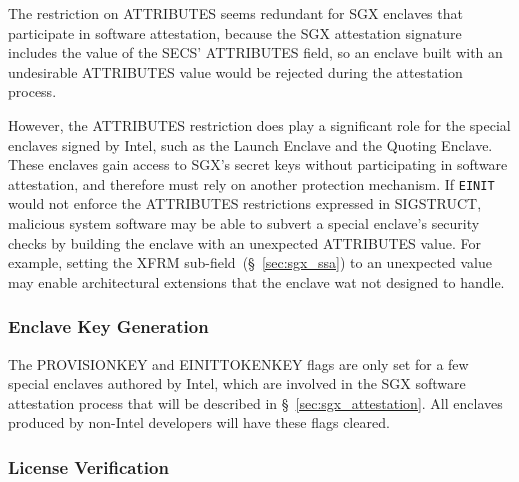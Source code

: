 The restriction on ATTRIBUTES seems redundant for SGX enclaves that participate
in software attestation, because the SGX attestation signature includes the
value of the SECS' ATTRIBUTES field, so an enclave built with an undesirable
ATTRIBUTES value would be rejected during the attestation process.


However, the ATTRIBUTES restriction does play a significant role for the
special enclaves signed by Intel, such as the Launch Enclave and the Quoting
Enclave. These enclaves gain access to SGX's secret keys without participating
in software attestation, and therefore must rely on another protection
mechanism. If \texttt{EINIT} would not enforce the ATTRIBUTES restrictions
expressed in SIGSTRUCT, malicious system software may be able to subvert a
special enclave's security checks by building the enclave with an unexpected
ATTRIBUTES value. For example, setting the XFRM
sub-field~(\S~\ref{sec:sgx_ssa}) to an unexpected value may enable
architectural extensions that the enclave wat not designed to handle.


\subsubsection{Enclave Key Generation}
\label{sec:sgx_egetkey}





The PROVISIONKEY and EINITTOKENKEY flags are only set for a few special
enclaves authored by Intel, which are involved in the SGX software attestation
process that will be described in \S~\ref{sec:sgx_attestation}. All enclaves
produced by non-Intel developers will have these flags cleared.



\subsubsection{License Verification}
\label{sec:sgx_launch_enclave}


